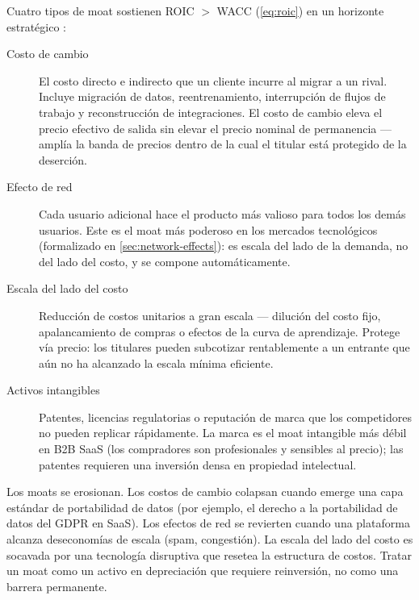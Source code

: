 Cuatro tipos de moat sostienen ROIC $>$ WACC (\cref{eq:roic}) en un horizonte estratégico
\parencite{porter1985,dranove7theconomics}:
\begin{description}
  \item[Costo de cambio] El costo directo e indirecto que un cliente incurre al migrar a
        un rival. Incluye migración de datos, reentrenamiento, interrupción de flujos de
        trabajo y reconstrucción de integraciones. El costo de cambio eleva el precio
        efectivo de salida sin elevar el precio nominal de permanencia --- amplía la banda
        de precios dentro de la cual el titular está protegido de la deserción.
  \item[Efecto de red] Cada usuario adicional hace el producto más valioso para todos los
        demás usuarios. Este es el moat más poderoso en los mercados tecnológicos
        (formalizado en \cref{sec:network-effects}): es escala del lado de la demanda, no
        del lado del costo, y se compone automáticamente.
  \item[Escala del lado del costo] Reducción de costos unitarios a gran escala --- dilución
        del costo fijo, apalancamiento de compras o efectos de la curva de aprendizaje.
        Protege vía precio: los titulares pueden subcotizar rentablemente a un entrante que
        aún no ha alcanzado la escala mínima eficiente.
  \item[Activos intangibles] Patentes, licencias regulatorias o reputación de marca que los
        competidores no pueden replicar rápidamente. La marca es el moat intangible más
        débil en B2B SaaS (los compradores son profesionales y sensibles al precio); las
        patentes requieren una inversión densa en propiedad intelectual.
\end{description}

Los moats se erosionan. Los costos de cambio colapsan cuando emerge una capa estándar de
portabilidad de datos (por ejemplo, el derecho a la portabilidad de datos del GDPR en SaaS).
Los efectos de red se revierten cuando una plataforma alcanza deseconomías de escala (spam,
congestión). La escala del lado del costo es socavada por una tecnología disruptiva que
resetea la estructura de costos. Tratar un moat como un activo en depreciación que requiere
reinversión, no como una barrera permanente.

